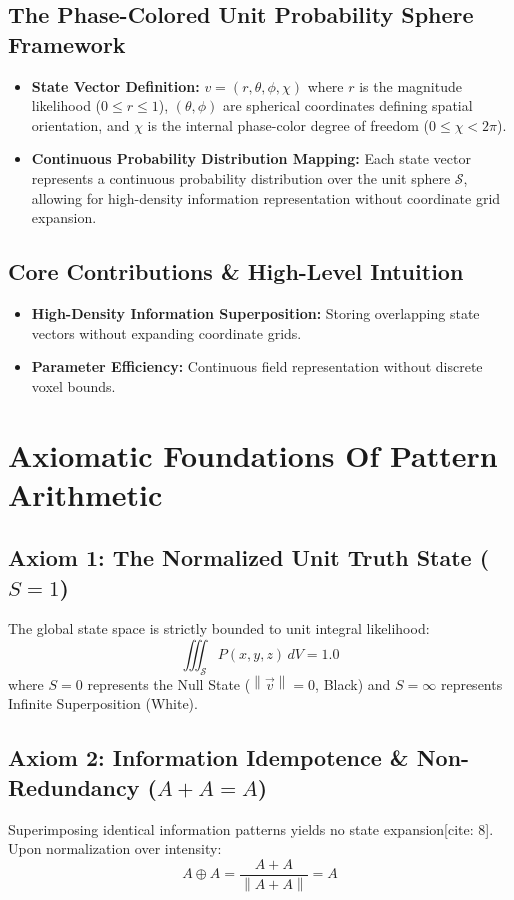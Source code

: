 \documentclass[12pt, a4paper]{article}
\providecommand{\norm}[1]{\left\lVert#1\right\rVert}
\begin{document}
\subsection{The Phase-Colored Unit Probability Sphere Framework}
\begin{itemize}
    \item \textbf{State Vector Definition:} $v = (r, \theta, \phi, \chi)$ where $r$ is the magnitude likelihood ($0 \leq r \leq 1$), $(\theta, \phi)$ are spherical coordinates defining spatial orientation, and $\chi$ is the internal phase-color degree of freedom ($0 \leq \chi < 2\pi$).
    \item \textbf{Continuous Probability Distribution Mapping:} Each state vector represents a continuous probability distribution over the unit sphere $\mathcal{S}$, allowing for high-density information representation without coordinate grid expansion.
\end{itemize}

\subsection{Core Contributions \& High-Level Intuition}
\begin{itemize}
    \item \textbf{High-Density Information Superposition:} Storing overlapping state vectors without expanding coordinate grids.
    \item \textbf{Parameter Efficiency:} Continuous field representation without discrete voxel bounds.
\end{itemize}

\section{Axiomatic Foundations Of Pattern Arithmetic}

\subsection{Axiom 1: The Normalized Unit Truth State ($S = 1$)}
The global state space is strictly bounded to unit integral likelihood:
\begin{equation}
    \iiint_{\mathcal{S}} P(x,y,z) \, dV = 1.0
\end{equation}
where $S = 0$ represents the Null State ($\norm{\vec{v}} = 0$, Black) and $S = \infty$ represents Infinite Superposition (White).

\subsection{Axiom 2: Information Idempotence \& Non-Redundancy ($A + A = A$)}
Superimposing identical information patterns yields no state expansion[cite: 8]. Upon normalization over intensity:
\begin{equation}
    A \oplus A = \frac{A + A}{\norm{A + A}} = A
\end{equation}
\end{document}
